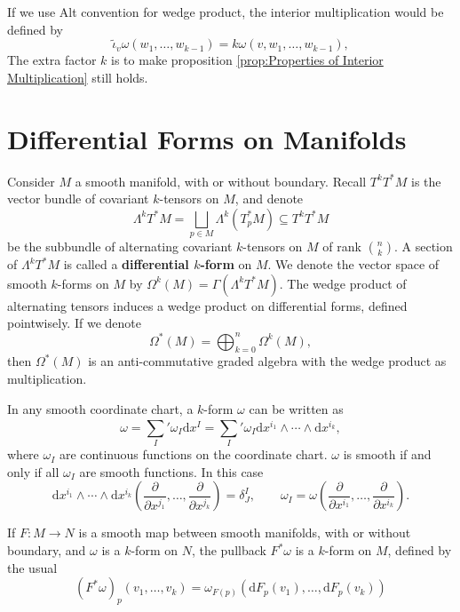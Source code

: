 \documentclass[../main.tex]{subfiles}
\begin{document}
If we use Alt convention for wedge product, the interior multiplication would be defined by
\begin{equation*}
  \tilde{\iota}_v \omega (w_1, \dots, w_{k-1}) = k \omega(v, w_1, \dots, w_{k-1}),
\end{equation*}
The extra factor $k$ is to make proposition \ref{prop:Properties of Interior Multiplication} still holds.

\section{Differential Forms on Manifolds}
Consider $M$ a smooth manifold, with or without boundary. Recall $T^k T^*M$ is the vector bundle of covariant $k$-tensors on $M$, and denote
\begin{equation}
  \Lambda^k T^*M = \bigsqcup_{p\in M} \Lambda^k(T_p^*M) \subseteq T^k T^*M
\end{equation}
be the subbundle of alternating covariant $k$-tensors on $M$ of rank $\binom{n}{k}$. A section of $\Lambda^k T^*M$ is called a \textbf{differential $k$-form} on $M$. We denote the vector space of smooth $k$-forms on $M$ by $\Omega^k(M) = \Gamma(\Lambda^k T^*M)$. The wedge product of alternating tensors induces a wedge product on differential forms, defined pointwisely. If we denote 
\begin{equation*}
  \Omega^*(M) = \bigoplus_{k=0}^n \Omega^k(M),
\end{equation*}
then $\Omega^*(M)$ is an anti-commutative graded algebra with the wedge product as multiplication.

In any smooth coordinate chart, a $k$-form $\omega$ can be written as
\begin{equation*}
  \omega = \sum_{I}^{}' \omega_I \mathrm{d} x^I = \sum_{I}^{}' \omega_I \mathrm{d} x^{i_1} \wedge \cdots \wedge \mathrm{d} x^{i_k},
\end{equation*}
where $\omega_I$ are continuous functions on the coordinate chart. $\omega$ is smooth if and only if all $\omega_I$ are smooth functions. In this case
\begin{equation*}
  \mathrm{d} x^{i_1} \wedge \cdots \wedge \mathrm{d} x^{i_k} (\frac{\partial }{\partial x^{j_1}}, \dots, \frac{\partial }{\partial x^{j_k}}) = \delta^I_J, \qquad \omega_I = \omega(\frac{\partial }{\partial x^{i_1}}, \dots, \frac{\partial }{\partial x^{i_k}}).
\end{equation*}

If $F: M \to N$ is a smooth map between smooth manifolds, with or without boundary, and $\omega$ is a $k$-form on $N$, the pullback $F^* \omega$ is a $k$-form on $M$, defined by the usual
\begin{equation*}
  (F^* \omega)_p(v_1, \dots, v_k) = \omega_{F(p)}(\mathrm{d} F_p(v_1), \dots, \mathrm{d} F_p(v_k))
\end{equation*}
\end{document}
